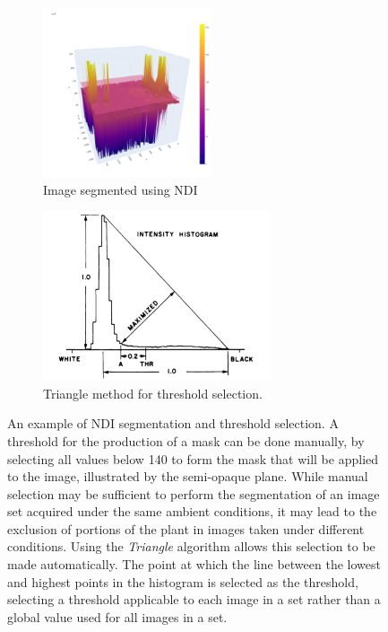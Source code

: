 \documentclass[letterpaper]{report}
\begin{document}
{\begin{figure}[h!]
	\centering
	\begin{subfigure}[h]{.48\textwidth}
	  \centering
	  \includegraphics[height=5cm]{./figures/ndi-1-of-2.png}
	  \caption{Image segmented using NDI}
	  \label{fig:ndi-1}
	\end{subfigure}
	\hfil
	\begin{subfigure}[h]{.48\textwidth}
	  \centering
	  \includegraphics[height=5cm]{./figures/triangle-algorithm}
	  \caption{Triangle method for threshold selection.}
	  \label{fig:ndi-2}
	\end{subfigure}
	\caption[NDI segmentation and threshold selection]{An example of NDI segmentation and threshold selection. A threshold for the production of a mask can be done manually,  by selecting all values below 140 to form the mask that will be applied to the image, illustrated by the semi-opaque plane. While manual selection may be sufficient to perform the segmentation of an image set acquired under the same ambient conditions, it may lead to the exclusion of portions of the plant in images taken under different conditions. Using the \textit{Triangle} algorithm \parencite{Brink1996-xy,Zack1977-yl} allows this selection to be made automatically. The point at which the line between the lowest and highest points in the histogram is selected as the threshold, selecting a threshold applicable to each image in a set rather than a global value used for all images in a set.}
	\label{fig:ndi-segmentation}
\end{figure}

}
\end{document}
